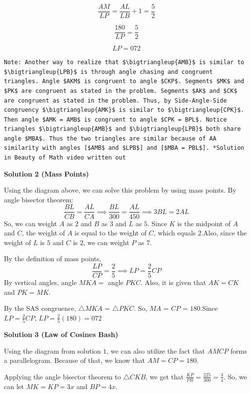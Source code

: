 \begin{enumerate}
 \[\frac {AM}{LP}=\frac {AL}{LB}+1=\frac {5}{2}\]

 \[\frac {180}{LP}=\frac {5}{2}\]

 \[LP=\boxed {072}\]
\begin{verbatim}
Note: Another way to realize that $\bigtriangleup{AMB}$ is similar to $\bigtriangleup{LPB}$ is through angle chasing and congruent triangles. Angle $AKM$ is congruent to angle $CKP$. Segments $MK$ and $PK$ are congruent as stated in the problem. Segments $AK$ and $CK$ are congruent as stated in the problem. Thus, by Side-Angle-Side congruency $\bigtriangleup{AMK}$ is similar to $\bigtriangleup{CPK}$. Then angle $AMK = AMB$ is congruent to angle $CPK = BPL$. Notice triangles $\bigtriangleup{AMB}$ and $\bigtriangleup{LPB}$ both share angle $MBA$. Thus the two triangles are similar because of AA similarity with angles [$AMB$ and $LPB$] and [$MBA = PBL$]. *Solution in Beauty of Math video written out
\end{verbatim}





\textbf{Solution 2 (Mass Points)}

Using the diagram above, we can solve this problem by using mass points. By angle bisector theorem:
 \[\frac{BL}{CB}=\frac{AL}{CA}\implies\frac{BL}{300}=\frac{AL}{450}\implies 3BL=2AL\]So, we can weight $A$ as $2$ and $B$ as $3$ and $L$ as $5$. Since $K$ is the midpoint of $A$ and $C$, the weight of $A$ is equal to the weight of $C$, which equals $2$.Also, since the weight of $L$ is $5$ and $C$ is $2$, we can weight $P$ as $7$.

 By the definition of mass points, 
 \[\frac{LP}{CP}=\frac{2}{5}\implies LP=\frac{2}{5}CP\]By vertical angles, angle $MKA =$ angle $PKC$. Also, it is given that $AK=CK$ and $PK=MK$.

 By the SAS congruence, $\triangle MKA$ = $\triangle PKC$. So, $MA$ = $CP$ = $180$.Since $LP=\frac{2}{5}CP$, $LP = \frac{2}{5}(180) = \boxed{072}$




\textbf{Solution 3 (Law of Cosines Bash)}

Using the diagram from solution $1$, we can also utilize the fact that $AMCP$ forms a parallelogram. Because of that, we know that $AM = CP = 180$.

 Applying the angle bisector theorem to $\triangle CKB$, we get that $\frac{KP}{PB} = \frac{225}{300} = \frac{3}{4}.$ So, we can let $MK = KP = 3x$ and $BP = 4x$. 


\end{enumerate}
